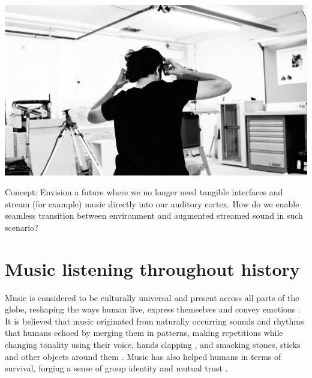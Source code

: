 \documentclass[manuscript,screen]{acmart}
\begin{document}
\begin{teaserfigure}
  \includegraphics[trim={0 5.5cm 0 3.5cm}, clip, width=\textwidth]{acmart-master-2/samples/test2bw.png}
  \caption{Concept: Envision a future where we no longer need tangible interfaces and stream (for example) music directly into our auditory cortex. How do we enable seamless transition between environment and augmented streamed sound in such scenario?}
  \label{fig:teaser}
\end{teaserfigure}
\maketitle

\section{Music listening throughout history}

Music is considered to be culturally universal \cite{campbell1997music, seeger1971reflections} and present across all parts of the globe, reshaping the ways human live, express themselves and convey emotions \cite{juslin2001music,montagu2017music}. It is believed that music originated from naturally occurring sounds and rhythms that humans echoed by merging them in patterns, making repetitions while changing tonality using their voice\cite{montagu2017music, morley2013prehistory}, hands clapping \cite{kassler1987dancing}, and smacking stones, sticks and other objects around them \cite{montagu2014horns}. Music has also helped humans in terms of survival, forging a sense of group identity and mutual trust \cite{conard2009new}. 
\end{document}
